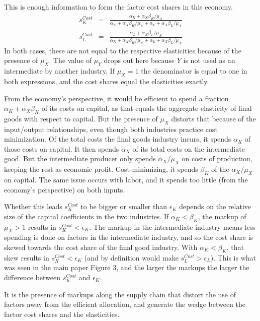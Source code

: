 \documentclass[11pt]{article}
\begin{document}
This is enough information to form the factor cost shares in this economy.
\begin{eqnarray}
	s_K^{Cost} &=& \frac{\alpha_K + \alpha_X \beta_K/\mu_X}{\alpha_K + \alpha_X \beta_K/\mu_X + \alpha_L + \alpha_X \beta_L/\mu_X} \\
	s_L^{Cost} &=& \frac{\alpha_L + \alpha_X \beta_L/\mu_X}{\alpha_K + \alpha_X \beta_K/\mu_X + \alpha_L + \alpha_X \beta_L/\mu_X}
\end{eqnarray}
In both cases, these are not equal to the respective elasticities because of the presence of $\mu_X$. The value of $\mu_Y$ drops out here because $Y$ is not used as an intermediate by another industry. If $\mu_X = 1$ the denominator is equal to one in both expressions, and the cost shares equal the elasticities exactly. 

From the economy's perspective, it would be efficient to spend a fraction $\alpha_K + \alpha_X \beta_K$ of its costs on capital, as that equals the aggregate elasticity of final goods with respect to capital. But the presence of $\mu_X$ distorts that because of the input/output relationships, even though both industries practice cost minimization. Of the total costs the final goods industry incurs, it spends $\alpha_K$ of those costs on capital. It then spends $\alpha_X$ of its total costs on the intermediate good. But the intermediate producer only spends $\alpha_X/\mu_X$ on costs of production, keeping the rest as economic profit. Cost-minimizing, it spends $\beta_K$ of the $\alpha_X/\mu_X$ on capital. The same issue occurs with labor, and it spends too little (from the economy's perspective) on both inputs. 

Whether this leads $s_K^{Cost}$ to be bigger or smaller than $\epsilon_K$ depends on the relative size of the capital coefficients in the two industries. If $\alpha_K < \beta_K$, the markup of $\mu_X > 1$ results in $s_K^{Cost} < \epsilon_K$. The markup in the intermediate industry means less spending is done on factors in the intermediate industry, and so the cost share is skewed towards the cost share of the final good industry. With $\alpha_K < \beta_K$, that skew results in $s_K^{Cost} < \epsilon_K$ (and by definition would make $s_L^{Cost} > \epsilon_L$). This is what was seen in the main paper Figure 3, and the larger the markups the larger the difference between $s_K^{Cost}$ and $\epsilon_K$.

It is the presence of markups along the supply chain that distort the use of factors away from the efficient allocation, and generate the wedge between the factor cost shares and the elasticities.
\end{document}
